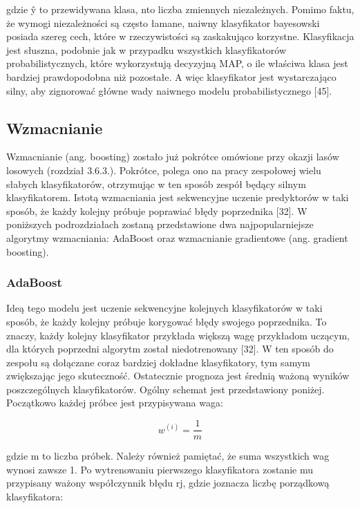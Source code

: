 \noindent gdzie ŷ to przewidywana klasa, nto liczba zmiennych niezależnych. Pomimo faktu, że wymogi niezależności są często łamane, naiwny klasyfikator bayesowski posiada szereg cech, które w rzeczywistości są zaskakująco korzystne. Klasyfikacja jest słuszna, podobnie jak w przypadku wszystkich klasyfikatorów probabilistycznych, które wykorzystują decyzyjną MAP, o ile właściwa klasa jest bardziej prawdopodobna niż pozostałe. A więc klasyfikator jest wystarczająco silny, aby zignorować główne wady naiwnego modelu probabilistycznego [45].

\subsection{Wzmacnianie}
\label{cha:Wzmacnianie}

Wzmacnianie (ang. boosting) zostało już pokrótce omówione przy okazji lasów losowych (rozdział 3.6.3.). Pokrótce, polega ono na pracy zespołowej wielu słabych klasyfikatorów, otrzymując w ten sposób zespół będący silnym klasyfikatorem. Istotą wzmacniania jest sekwencyjne uczenie predyktorów w taki sposób, że każdy kolejny próbuje poprawiać błędy poprzednika [32]. W poniższych podrozdziałach zostaną przedstawione dwa najpopularniejsze algorytmy wzmacniania: AdaBoost oraz wzmacnianie gradientowe (ang. gradient boosting). 

\subsubsection{AdaBoost}
\label{AdaBoost}

Ideą tego modelu jest uczenie sekwencyjne kolejnych klasyfikatorów w taki sposób, że każdy kolejny próbuje korygować błędy swojego poprzednika. To znaczy, każdy kolejny klasyfikator przykłada większą wagę przykładom uczącym, dla których poprzedni algorytm został niedotrenowany [32]. W ten sposób do zespołu są dołączane coraz bardziej dokładne klasyfikatory, tym samym zwiększając jego skuteczność. Ostatecznie prognoza jest średnią ważoną wyników poszczególnych klasyfikatorów. Ogólny schemat jest przedstawiony poniżej.
    Początkowo każdej próbce jest przypisywana waga:

\begin{equation}
w^{(i)}=\frac 1 m
\end{equation}

\noindent gdzie m to liczba próbek. Należy również pamiętać, że suma wszystkich wag wynosi zawsze 1. Po wytrenowaniu pierwszego klasyfikatora zostanie mu przypisany ważony współczynnik błędu rj, gdzie joznacza liczbę porządkową klasyfikatora:

